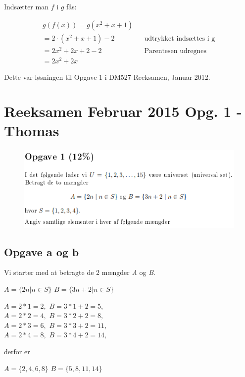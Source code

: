 \documentclass{article}
\begin{document}
Indsætter man $f$ i $g$ fås:
\begin{center}
\begin{align*}
g(f(x)) = g(x^2 + x + 1) \\
= 2 \cdot (x^2 + x + 1) - 2 && \text{udtrykket indsættes i g} \\
= 2x^2 + 2x + 2 - 2 && \text{Parentesen udregnes} \\
= 2x^2 + 2x
\end{align*}
\end{center}

Dette var løsningen til Opgave 1 i DM527 Reeksamen, Januar 2012.

\section{Reeksamen Februar 2015 Opg. 1 - Thomas}
\begin{figure}[h]
\includegraphics[scale=0.85]{2015Opgave1Formulering}
\end{figure}

\subsection*{Opgave a og b}
Vi starter med at betragte de 2 mængder \emph{A} og \emph{B}.

\begin{center}

$A = \{ 2n | n \in S \}$ \qquad $B = \{ 3n +2 | n \in S \}$

$A = 2 * 1 = 2,$ \qquad $B = 3 * 1 + 2 = 5, $\\
$A = 2 * 2 = 4,$ \qquad $B = 3 * 2 + 2 = 8, $\\
$A = 2 * 3 = 6,$ \qquad $B = 3 * 3 + 2 = 11, $\\
$A = 2 * 4 = 8,$ \qquad $B = 3 * 4 + 2 = 14, $

derfor er

$A = \{ 2, 4, 6, 8 \}$ \qquad $B = \{ 5, 8, 11, 14 \}$
\end{center}
\end{document}
